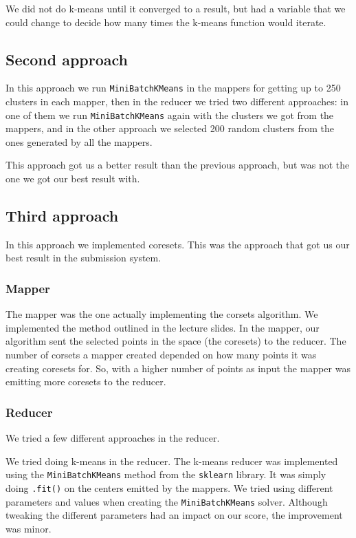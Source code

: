 \documentclass[a4paper, 11pt]{article}
\begin{document}
We did not do k-means until it converged to a result, but had a variable that we could change to decide how many times the k-means function would iterate.

\subsection*{Second approach}
In this approach we run \texttt{MiniBatchKMeans} in the mappers for getting up to 250 clusters in each mapper, then in the reducer we tried two different approaches: in one of them we run \texttt{MiniBatchKMeans} again with the clusters we got from the mappers, and in the other approach we selected 200 random clusters from the ones generated by all the mappers.

This approach got us a better result than the previous approach, but was not the one we got our best result with.

\subsection*{Third approach}
In this approach we implemented coresets. This was the approach that got us our best result in the submission system.

\subsubsection*{Mapper}

The mapper was the one actually implementing the corsets algorithm. We implemented the method outlined in the lecture slides. In the mapper, our algorithm sent the selected points in the space (the coresets) to the reducer. The number of corsets a mapper created depended on how many points it was creating coresets for. So, with a higher number of points as input the mapper was emitting more coresets to the reducer.

\subsubsection*{Reducer}

We tried a few different approaches in the reducer.

We tried doing k-means in the reducer. The k-means reducer was implemented using the \texttt{MiniBatchKMeans} method from the \texttt{sklearn} library. It was simply doing \texttt{.fit()} on the centers emitted by the mappers. We tried using different parameters and values when creating the \texttt{MiniBatchKMeans} solver. Although tweaking the different parameters had an impact on our score, the improvement was minor.
\end{document}

